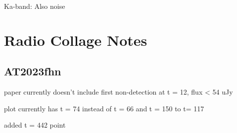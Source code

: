 \documentclass[twocolumn,twocolappendix]{aastex631}
\begin{document}
Ka-band: Also noise

%
%
       

\section{Radio Collage Notes}
\subsection{AT2023fhn}
paper currently doesn't include first non-detection at t = 12, flux < 54 uJy

plot currently has t = 74 instead of t = 66 and t = 150 to t= 117

added t = 442 point
\end{document}
